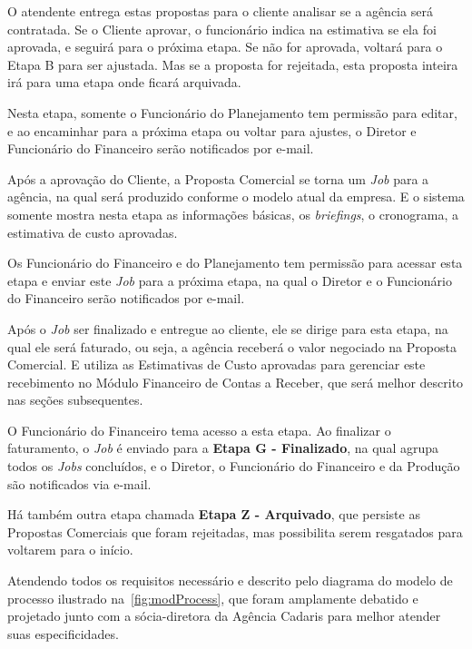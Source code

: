 \documentclass[
  12pt,            %
  openany,
  oneside,
  a4paper,         %
  english,      %
  brazil
]{article}
\numberwithin{figure}{section}
\numberwithin{table}{section}
\newcounter{subsubsubsection}[subsubsection]
\begin{document}
O atendente entrega estas propostas para o cliente analisar se a agência será contratada. Se o Cliente aprovar, o funcionário indica na estimativa se ela foi aprovada, e seguirá para o próxima etapa. Se não for aprovada, voltará para o Etapa B para ser ajustada. Mas se a proposta for rejeitada, esta proposta inteira irá para uma etapa onde ficará arquivada.

Nesta etapa, somente o Funcionário do Planejamento tem permissão para editar, e ao encaminhar para a próxima etapa ou voltar para ajustes, o Diretor e Funcionário do Financeiro serão notificados por e-mail.



Após a aprovação do Cliente, a Proposta Comercial se torna um \textit{Job} para a agência, na qual será produzido conforme o modelo atual da empresa. E o sistema somente mostra nesta etapa as informações básicas, os \textit{briefings}, o cronograma, a estimativa de custo aprovadas.

Os Funcionário do Financeiro e do Planejamento tem permissão para acessar esta etapa e enviar este \textit{Job} para a próxima etapa, na qual o Diretor e o Funcionário do Financeiro serão notificados por e-mail.



Após o \textit{Job} ser finalizado e entregue ao cliente, ele se dirige para esta etapa, na qual ele será faturado, ou seja, a agência receberá o valor negociado na Proposta Comercial. E utiliza as Estimativas de Custo aprovadas para gerenciar este recebimento no Módulo Financeiro de Contas a Receber, que será melhor descrito nas seções subsequentes.

O Funcionário do Financeiro tema acesso a esta etapa. Ao finalizar o faturamento, o \textit{Job} é enviado para a \textbf{Etapa G - Finalizado}, na qual agrupa todos os \textit{Jobs} concluídos, e o Diretor, o Funcionário do Financeiro e da Produção são notificados via e-mail.

Há também outra etapa chamada \textbf{Etapa Z - Arquivado}, que persiste as Propostas Comerciais que foram rejeitadas, mas possibilita serem resgatados para voltarem para o início.

Atendendo todos os requisitos necessário e descrito pelo diagrama do modelo de processo ilustrado na~\autoref{fig:modProcess}, que foram amplamente debatido e projetado junto com a sócia-diretora da Agência Cadaris para melhor atender suas especificidades.
\end{document}
